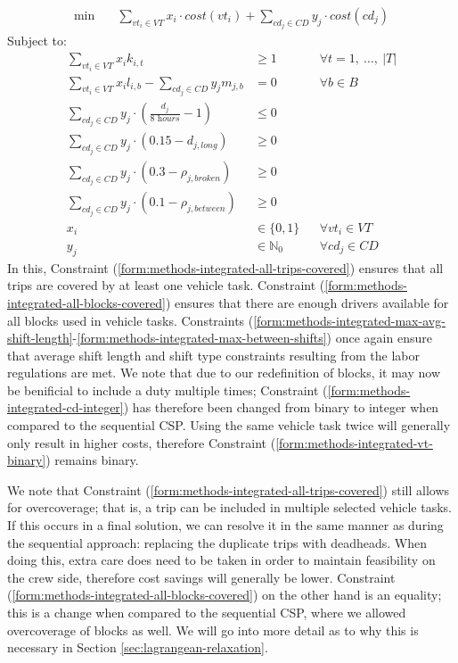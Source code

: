 \documentclass[]{article}
\begin{document}
\begin{align}
\min \quad
& \sum_{vt_i \in VT} x_{i} \cdot cost(vt_i) + \sum_{cd_j \in CD} y_{j} \cdot cost(cd_j)  
\end{align}
Subject to:
\begin{align}
\sum_{vt_i \in VT} x_{i}k_{i,t} &\geq 1 && \forall t = 1,\:\dots,\:|T| \label{form:methods-integrated-all-trips-covered} \\
\sum_{vt_i \in VT}x_i l_{i,b} - \sum_{cd_j \in CD}y_j m_{j,b} &= 0 && \forall b \in B \label{form:methods-integrated-all-blocks-covered} \\
\sum_{cd_j \in \textit{CD}} y_{j} \cdot (\frac{d_{j}}{\textit{8 hours}} - 1) &\leq 0 && \label{form:methods-integrated-max-avg-shift-length}\\
\sum_{cd_j \in \textit{CD}} y_{j} \cdot (0.15 - d_{j,\textit{long}}) &\geq 0 && \label{form:methods-integrated-max-long-shifts}\\
\sum_{cd_j \in \textit{CD}} y_{j} \cdot (0.3 - \rho_{j,\textit{broken}}) &\geq 0 && \label{form:methods-integrated-max-broken-shifts}\\
\sum_{cd_j \in \textit{CD}} y_{j} \cdot (0.1 - \rho_{j,\textit{between}}) &\geq 0 && \label{form:methods-integrated-max-between-shifts}\\
x_{i} &\in \{ 0, 1 \} && \forall vt_i \in VT \label{form:methods-integrated-vt-binary} \\
y_{j} &\in \mathbb{N}_0 && \forall cd_j \in CD \label{form:methods-integrated-cd-integer}
\end{align}
In this, Constraint (\ref{form:methods-integrated-all-trips-covered}) ensures that all trips are covered by at least one vehicle task. Constraint (\ref{form:methods-integrated-all-blocks-covered}) ensures that there are enough drivers available for all blocks used in vehicle tasks. Constraints (\ref{form:methods-integrated-max-avg-shift-length}-\ref{form:methods-integrated-max-between-shifts}) once again ensure that average shift length and shift type constraints resulting from the labor regulations are met. We note that due to our redefinition of blocks, it may now be benificial to include a duty multiple times; Constraint (\ref{form:methods-integrated-cd-integer}) has therefore been changed from binary to integer when compared to the sequential CSP. Using the same vehicle task twice will generally only result in higher costs, therefore Constraint (\ref{form:methods-integrated-vt-binary}) remains binary. 

We note that Constraint (\ref{form:methods-integrated-all-trips-covered}) still allows for overcoverage; that is, a trip can be included in multiple selected vehicle tasks. If this occurs in a final solution, we can resolve it in the same manner as during the sequential approach: replacing the duplicate trips with deadheads. When doing this, extra care does need to be taken in order to maintain feasibility on the crew side, therefore cost savings will generally be lower. Constraint (\ref{form:methods-integrated-all-blocks-covered}) on the other hand is an equality; this is a change when compared to the sequential CSP, where we allowed overcoverage of blocks as well. We will go into more detail as to why this is necessary in Section \ref{sec:lagrangean-relaxation}. 
\end{document}
